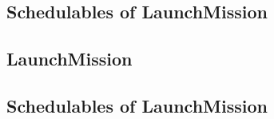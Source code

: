 \documentclass[10pt,a4paper]{article}
\begin{document}
\subsection{Schedulables of LaunchMission}


\newpage


\subsection{LaunchMission}

\newpage

\subsection{Schedulables of LaunchMission}


\newpage


\end{document}

